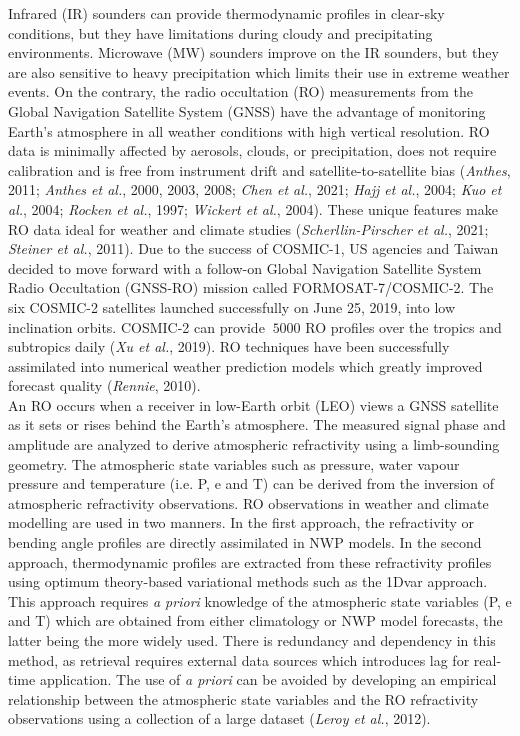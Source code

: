 \documentclass[a4paper,12pt,twoside]{article}
\begin{document}
\noindent Infrared (IR) sounders can provide thermodynamic profiles in clear-sky conditions, but they have limitations during cloudy and precipitating environments. Microwave (MW) sounders improve on the IR sounders, but they are also sensitive to heavy precipitation which limits their use in extreme weather events. On the contrary, the radio occultation (RO) measurements from the Global Navigation Satellite System (GNSS) have the advantage of monitoring Earth's atmosphere in all weather conditions with high vertical resolution. RO data is minimally affected by aerosols, clouds, or precipitation, does not require calibration and is free from instrument drift and satellite-to-satellite bias (\textit{Anthes}, 2011; \textit{Anthes et al.}, 2000, 2003, 2008; \textit{Chen et al.}, 2021; \textit{Hajj et al.}, 2004; \textit{Kuo et al.}, 2004; \textit{Rocken et al.}, 1997; \textit{Wickert et al.}, 2004). These unique features make RO data ideal for weather and climate studies (\textit{Scherllin-Pirscher et al.}, 2021; \textit{Steiner et al.}, 2011). Due to the success of COSMIC-1, US agencies and Taiwan decided to move forward with a follow-on Global Navigation Satellite System Radio Occultation (GNSS-RO) mission called FORMOSAT-7/COSMIC-2. The six COSMIC-2 satellites launched successfully on June 25, 2019, into low inclination orbits. COSMIC-2 can  provide $~5000$ RO profiles over the tropics and subtropics daily (\textit{Xu et al.}, 2019). RO techniques have been successfully assimilated into numerical weather prediction models which greatly improved forecast quality (\textit{Rennie}, 2010). \\

\noindent An RO occurs when a receiver in low-Earth orbit (LEO) views a GNSS satellite as it sets or rises behind the Earth’s atmosphere. The measured signal phase and amplitude are analyzed to derive atmospheric refractivity using a limb-sounding geometry.
The atmospheric state variables such as pressure, water vapour pressure and temperature (i.e. P, e and T) can be derived from the inversion of atmospheric refractivity observations. RO observations in weather and climate modelling are used in two manners. In the first approach, the refractivity or bending angle profiles are directly assimilated in NWP models. In the second approach, thermodynamic profiles are extracted from these refractivity profiles using optimum theory-based variational methods such as the 1Dvar approach. This approach requires \emph{a priori} knowledge of the atmospheric state variables (P, e and T) which are obtained from either climatology or NWP model forecasts, the latter being the more widely used. There is redundancy and dependency in this method, as retrieval requires external data sources which introduces lag for real-time application. The use of \emph{a priori} can be avoided by developing an empirical relationship between the atmospheric state variables and the RO refractivity observations using a collection of a large dataset (\textit{Leroy et al.}, 2012). \\
\end{document}
